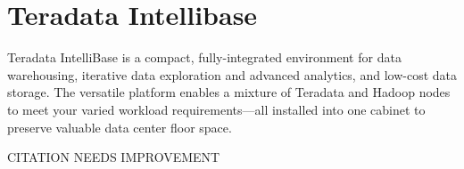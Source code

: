 \section{Teradata Intellibase}

Teradata IntelliBase is a compact, fully-integrated environment for data 
warehousing, iterative data exploration and advanced analytics, and low-cost 
data storage. The versatile platform enables a mixture of Teradata and Hadoop 
nodes to meet your varied workload requirements—all installed into one cabinet
to preserve valuable data center floor space.
\cite{Teradata Intellibase}

CITATION NEEDS IMPROVEMENT

